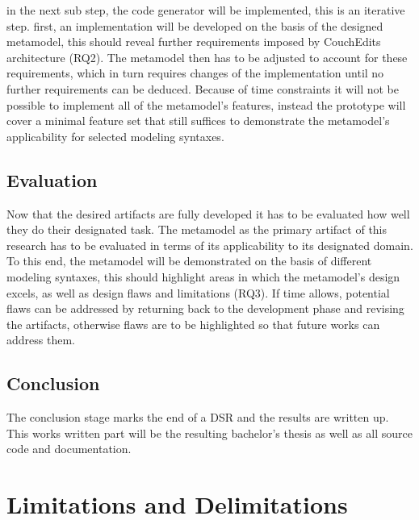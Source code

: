 \documentclass[10pt,a4paper,oneside]{scrartcl}
\newcommand\hint[2]{
\ifthenelse{\boolean{showhints}}{
\begin{center}
\colorbox{black!10}{
\begin{minipage}{.963\textwidth}
#2\hfill\textbf{#1}
\end{minipage}
}\end{center}}{}
}
\begin{document}
in the next sub step, the code generator will be implemented, this is an iterative step. first, an implementation will be developed on the basis of the designed metamodel, this should reveal further requirements imposed by CouchEdits architecture (RQ2). The metamodel then has to be adjusted to account for these requirements, which in turn requires changes of the implementation until no further requirements can be deduced. Because of time constraints it will not be possible to implement all of the metamodel's features, instead the prototype will cover a minimal feature set that still suffices to demonstrate the metamodel's applicability for selected modeling syntaxes.

\subsection{Evaluation}
Now that the desired artifacts are fully developed it has to be evaluated how well they do their designated task. The metamodel as the primary artifact of this research has to be evaluated in terms of its applicability to its designated domain. To this end, the metamodel will be demonstrated on the basis of different modeling syntaxes, this should highlight areas in which the metamodel's design excels, as well as design flaws and limitations (RQ3). If time allows, potential flaws can be addressed by returning back to the development phase and revising the artifacts, otherwise flaws are to be highlighted so that future works can address them.

\subsection{Conclusion}
The conclusion stage marks the end of a DSR and the results are written up. This works written part will be the resulting bachelor's thesis as well as all source code and documentation.



\section{Limitations and Delimitations}

\end{document}
